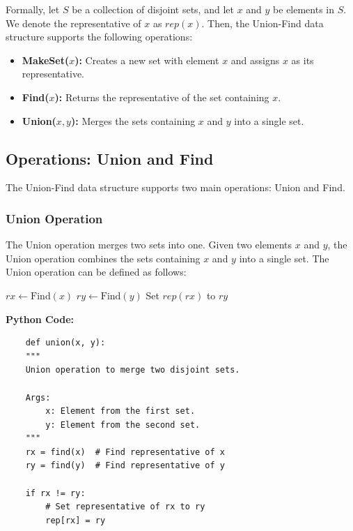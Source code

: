 \documentclass[12pt]{book} %
\begin{document}
Formally, let \(S\) be a collection of disjoint sets, and let \(x\) and \(y\) be elements in \(S\). We denote the representative of \(x\) as \(rep(x)\). Then, the Union-Find data structure supports the following operations:

\begin{itemize}
    \item \textbf{MakeSet(\(x\)):} Creates a new set with element \(x\) and assigns \(x\) as its representative.
    \item \textbf{Find(\(x\)):} Returns the representative of the set containing \(x\).
    \item \textbf{Union(\(x, y\)):} Merges the sets containing \(x\) and \(y\) into a single set.
\end{itemize}

\subsection{Operations: Union and Find}

The Union-Find data structure supports two main operations: Union and Find.

\subsubsection{Union Operation}

The Union operation merges two sets into one. Given two elements \(x\) and \(y\), the Union operation combines the sets containing \(x\) and \(y\) into a single set. The Union operation can be defined as follows:
\FloatBarrier
\begin{algorithm}[H]
\caption{Union(\(x, y\))}
\begin{algorithmic}[1]
    \State \(rx \gets \text{Find}(x)\)
    \State \(ry \gets \text{Find}(y)\)
        \State Set \(rep(rx)\) to \(ry\)
    \EndIf
\EndFunction
\end{algorithmic}
\end{algorithm}
\FloatBarrier
\textbf{Python Code:}
\FloatBarrier
\begin{lstlisting}
    def union(x, y):
    """
    Union operation to merge two disjoint sets.
    
    Args:
        x: Element from the first set.
        y: Element from the second set.
    """
    rx = find(x)  # Find representative of x
    ry = find(y)  # Find representative of y
    
    if rx != ry:
        # Set representative of rx to ry
        rep[rx] = ry
\end{lstlisting}
\end{document}
